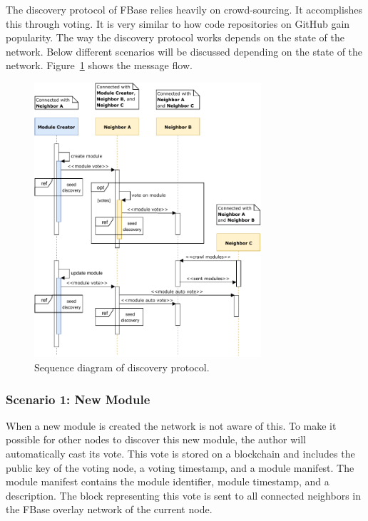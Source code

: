 The discovery protocol of FBase relies heavily on crowd-sourcing. It accomplishes this through voting. It is very similar to how code repositories on GitHub gain popularity. The way the discovery protocol works depends on the state of the network. Below different scenarios will be discussed depending on the state of the network. Figure~\ref{fig:discovery-protocol} shows the message flow.

\begin{figure}[h]
	\centering
	\includegraphics[width=0.75\textwidth]{images/discovery-protocol-main.pdf}
	\caption{\label{fig:discovery-protocol} Sequence diagram of discovery protocol.}
\end{figure}

\subsubsection{\textbf{Scenario 1: New Module}}

When a new module is created the network is not aware of this. To make it possible for other nodes to discover this new module, the author will automatically cast its vote. This vote is stored on a blockchain and includes the public key of the voting node, a voting timestamp, and a module manifest. The module manifest contains the module identifier, module timestamp, and a description. The block representing this vote is sent to all connected neighbors in the FBase overlay network of the current node. 

